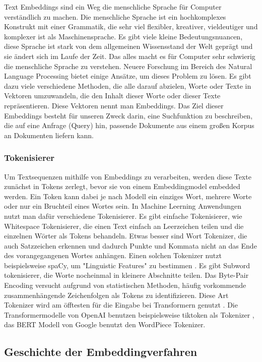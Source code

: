 Text Embeddings sind ein Weg die menschliche Sprache für Computer verständlich zu machen. 
Die menschliche Sprache ist ein hochkomplexes Konstrukt mit einer Grammatik, die sehr viel flexibler, kreativer, vieldeutiger und komplexer ist als Maschinensprache. 
Es gibt viele kleine Bedeutungsnuancen, diese Sprache ist stark von dem allgemeinen Wissensstand der Welt geprägt und sie ändert sich im Laufe der Zeit. 
Das alles macht es für Computer sehr schwierig die menschliche Sprache zu verstehen. 
Neuere Forschung im Bereich des Natural Language Processing bietet einige Ansätze, um dieses Problem zu lösen. 
Es gibt dazu viele verschiedene Methoden, die alle darauf abzielen, Worte oder Texte in Vektoren umzuwandeln, die den Inhalt dieser Worte oder dieser Texte repräsentieren.
Diese Vektoren nennt man Embeddings.
Das Ziel dieser Embeddings besteht für unseren Zweck darin, eine Suchfunktion zu beschreiben, die auf eine Anfrage (Query) hin, passende Dokumente aus einem großen Korpus an Dokumenten liefern kann.

\subsubsection{Tokenisierer}

Um Textsequenzen mithilfe von Embeddings zu verarbeiten, werden diese Texte zunächst in Tokens zerlegt, bevor sie von einem Embeddingmodel embedded werden.  
Ein Token kann dabei je nach Modell ein einziges Wort, mehrere Worte oder nur ein Bruchteil eines Wortes sein.
In Machine Leerning Anwendungen nutzt man dafür verschiedene Tokenisierer.
Es gibt einfache Tokenisierer, wie Whitespace Tokenisierer, die einen Text einfach an Leerzeichen teilen und die einzelnen Wörter als Tokens behandeln.
Etwas besser sind Wort Tokenizer, die auch Satzzeichen erkennen und dadurch Punkte und Kommata nicht an das Ende des vorangegangenen Wortes anhängen. 
Einen solchen Tokenizer nutzt beispielsweise spaCy, um "Linguistic Features" zu bestimmen \cite{honnibal2017}.
Es gibt Subword tokenisierer, die Worte nocheinmal in kleinere Abschnitte teilen.
Das Byte-Pair Encoding versucht aufgrund von statistischen Methoden, häufig vorkommende zusammenhängende Zeichenfolgen als Tokens zu identifizieren.
Diese Art Tokenizer wird am öfftesten für die Eingabe bei Transformern genutzt \cite{zouhar2023}.
Die Transformermodelle von OpenAI benutzen beispielsweise tiktoken als Tokenizer \cite{tiktoken2024}, das BERT Modell von Google benutzt den WordPiece Tokenizer.

\subsection{Geschichte der Embeddingverfahren}

